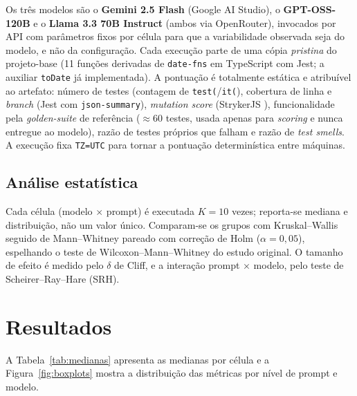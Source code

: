 \documentclass[12pt]{article}
\begin{document}
Os três modelos são o \textbf{Gemini 2.5 Flash} (Google AI Studio), o
\textbf{GPT-OSS-120B} e o \textbf{Llama 3.3 70B Instruct} (ambos via
OpenRouter), invocados por API com parâmetros fixos por célula para que a
variabilidade observada seja do modelo, e não da configuração. Cada execução
parte de uma cópia \emph{pristina} do projeto-base (11 funções derivadas de
\texttt{date-fns} em TypeScript com Jest; a auxiliar \texttt{toDate} já
implementada). A pontuação é totalmente estática e atribuível ao artefato:
número de testes (contagem de \texttt{test(}/\texttt{it(}), cobertura de linha e
\emph{branch} (Jest com \texttt{json-summary}), \emph{mutation score} (StrykerJS
\cite{stryker}), funcionalidade pela \emph{golden-suite} de referência ($\approx
60$ testes, usada apenas para \emph{scoring} e nunca entregue ao modelo), razão
de testes próprios que falham e razão de \emph{test smells}. A execução fixa
\texttt{TZ=UTC} para tornar a pontuação determinística entre máquinas.

\subsection{Análise estatística}

Cada célula (modelo $\times$ prompt) é executada $K=10$ vezes; reporta-se mediana
e distribuição, não um valor único. Comparam-se os grupos com Kruskal--Wallis
seguido de Mann--Whitney pareado com correção de Holm ($\alpha = 0{,}05$),
espelhando o teste de Wilcoxon--Mann--Whitney do estudo original. O tamanho de
efeito é medido pelo $\delta$ de Cliff, e a interação prompt $\times$ modelo, pelo
teste de Scheirer--Ray--Hare (SRH).

\section{Resultados}

A Tabela~\ref{tab:medianas} apresenta as medianas por célula e a
Figura~\ref{fig:boxplots} mostra a distribuição das métricas por nível de prompt
e modelo.
\end{document}
